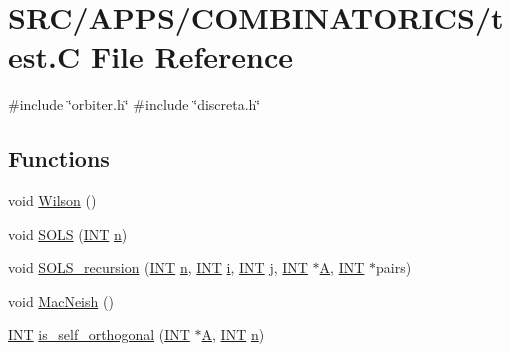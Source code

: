 \hypertarget{test_8_c}{}\section{S\+R\+C/\+A\+P\+P\+S/\+C\+O\+M\+B\+I\+N\+A\+T\+O\+R\+I\+C\+S/test.C File Reference}
\label{test_8_c}
{\ttfamily \#include \char`\"{}orbiter.\+h\char`\"{}}\newline
{\ttfamily \#include \char`\"{}discreta.\+h\char`\"{}}\newline
\subsection*{Functions}
\begin{DoxyCompactItemize}
\item 
void \mbox{\hyperlink{test_8_c_a74d70c4515ad1bfa1f5dfd97aee72491}{Wilson}} ()
\item 
void \mbox{\hyperlink{test_8_c_a329202aa66e5bfda431cfd8a376a6427}{S\+O\+LS}} (\mbox{\hyperlink{galois_8h_a09fddde158a3a20bd2dcadb609de11dc}{I\+NT}} \mbox{\hyperlink{simeon_8_c_a7f2cd26777ce0ff3fdaf8d02aacbddfb}{n}})
\item 
void \mbox{\hyperlink{test_8_c_adfaf5a85da8ed1de3f1310144b31cb41}{S\+O\+L\+S\+\_\+recursion}} (\mbox{\hyperlink{galois_8h_a09fddde158a3a20bd2dcadb609de11dc}{I\+NT}} \mbox{\hyperlink{simeon_8_c_a7f2cd26777ce0ff3fdaf8d02aacbddfb}{n}}, \mbox{\hyperlink{galois_8h_a09fddde158a3a20bd2dcadb609de11dc}{I\+NT}} \mbox{\hyperlink{alphabet2_8_c_acb559820d9ca11295b4500f179ef6392}{i}}, \mbox{\hyperlink{galois_8h_a09fddde158a3a20bd2dcadb609de11dc}{I\+NT}} \mbox{\hyperlink{alphabet2_8_c_a37d972ae0b47b9099e30983131d31916}{j}}, \mbox{\hyperlink{galois_8h_a09fddde158a3a20bd2dcadb609de11dc}{I\+NT}} $\ast$\mbox{\hyperlink{simeon_8_c_a97833f04c3a9c008df5521a2fc291bb4}{A}}, \mbox{\hyperlink{galois_8h_a09fddde158a3a20bd2dcadb609de11dc}{I\+NT}} $\ast$pairs)
\item 
void \mbox{\hyperlink{test_8_c_aa6a4aba2ea40865428ca95da4a7f94fc}{Mac\+Neish}} ()
\item 
\mbox{\hyperlink{galois_8h_a09fddde158a3a20bd2dcadb609de11dc}{I\+NT}} \mbox{\hyperlink{test_8_c_a01348fd2718cf44200633898510cb4dd}{is\+\_\+self\+\_\+orthogonal}} (\mbox{\hyperlink{galois_8h_a09fddde158a3a20bd2dcadb609de11dc}{I\+NT}} $\ast$\mbox{\hyperlink{simeon_8_c_a97833f04c3a9c008df5521a2fc291bb4}{A}}, \mbox{\hyperlink{galois_8h_a09fddde158a3a20bd2dcadb609de11dc}{I\+NT}} \mbox{\hyperlink{simeon_8_c_a7f2cd26777ce0ff3fdaf8d02aacbddfb}{n}})

\end{DoxyCompactItemize}
